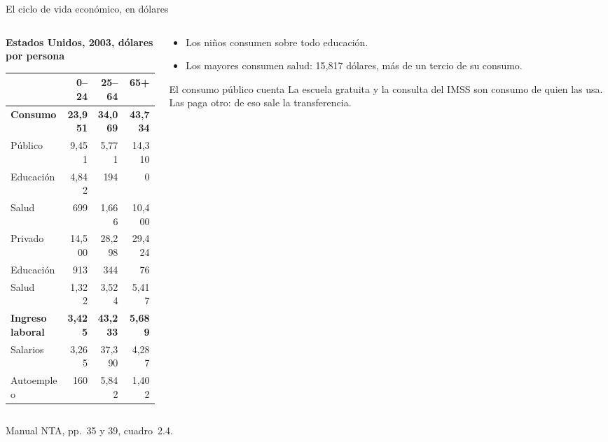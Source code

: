 \documentclass[aspectratio=169,11pt]{beamer}
\newcommand{\fuente}[1]{\par\vfill{\small\color{cGris}#1\par}}
\begin{document}
\begin{frame}{El ciclo de vida económico, en dólares}
  \begin{columns}[T]
    \begin{column}{0.60\textwidth}
      \textbf{Estados Unidos, 2003, dólares por persona}\par\smallskip
      \begin{tabular}{@{}lrrr@{}}
        \toprule
        & 0--24 & 25--64 & 65+ \\
        \midrule
        \textbf{Consumo} & \textbf{23,951} & \textbf{34,069} & \textbf{43,734} \\
        \quad Público & 9,451 & 5,771 & 14,310 \\
        \quad\quad Educación & 4,842 & 194 & 0 \\
        \quad\quad Salud & 699 & 1,666 & 10,400 \\
        \quad Privado & 14,500 & 28,298 & 29,424 \\
        \quad\quad Educación & 913 & 344 & 76 \\
        \quad\quad Salud & 1,322 & 3,524 & 5,417 \\
        \textbf{Ingreso laboral} & \textbf{3,425} & \textbf{43,233} & \textbf{5,689} \\
        \quad Salarios & 3,265 & 37,390 & 4,287 \\
        \quad Autoempleo & 160 & 5,842 & 1,402 \\
        \bottomrule
      \end{tabular}
    \end{column}
    \begin{column}{0.37\textwidth}
      \begin{itemize}
        \item Los niños consumen sobre todo educación.
        \item Los mayores consumen salud: 15,817 dólares, más de un tercio de su consumo.
      \end{itemize}
      \pause
      \begin{block}{El consumo público cuenta}
        La escuela gratuita y la consulta del IMSS son consumo de quien las usa. Las paga otro: de eso sale la transferencia.
      \end{block}
    \end{column}
  \end{columns}
  \fuente{Manual NTA, pp.~35 y 39, cuadro~2.4.}
\end{frame}
\end{document}

